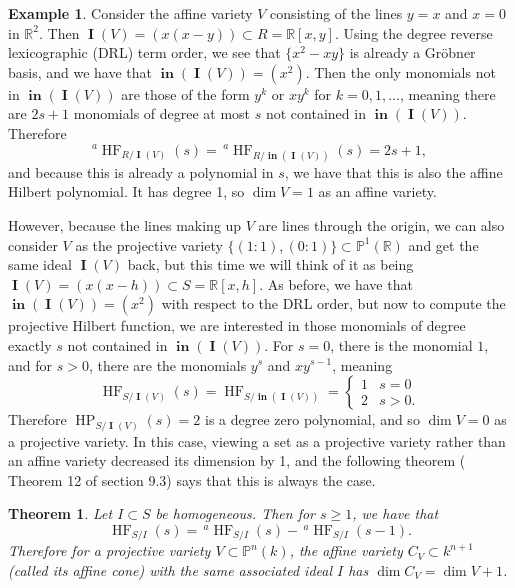 \documentclass[11pt]{article}
\newcommand{\R}{\mathbb{R}}
\newcommand{\Proj}{\mathbb{P}}
\DeclareMathOperator{\Init}{\mathbf{in}}
\DeclareMathOperator{\HF}{HF}
\DeclareMathOperator{\HP}{HP}
\DeclareMathOperator{\I}{\mathbf{I}}
\newtheorem{theorem}{Theorem}
\theoremstyle{definition}
\newtheorem{example}{Example}
\begin{document}
\begin{example}
	Consider the affine variety $V$ consisting of the lines $y = x$ and $x = 0$ in $\R^2$. Then $\I(V) = (x(x - y)) \subset R = \R[x,y]$. Using the degree reverse lexicographic (DRL) term order, we see that $\{x^2 - xy\}$ is already a Gröbner basis, and we have that $\Init(\I(V)) = (x^2)$. Then the only monomials not in $\Init(\I(V))$ are those of the form $y^k$ or $xy^k$ for $k = 0, 1, \dots$, meaning there are $2s + 1$ monomials of degree at most $s$ not contained in $\Init(\I(V))$. Therefore \[ ^a\HF_{R/\I(V)}(s) = \,^a\HF_{R/\Init(\I(V))}(s) = 2s + 1, \] and because this is already a polynomial in $s$, we have that this is also the affine Hilbert polynomial. It has degree 1, so $\dim V = 1$ as an affine variety. 

	However, because the lines making up $V$ are lines through the origin, we can also consider $V$ as the projective variety $\{(1:1), (0:1)\} \subset \Proj^1(\R)$ and get the same ideal $\I(V)$ back, but this time we will think of it as being $\I(V) = (x(x - h)) \subset S = \R[x,h]$. As before, we have that $\Init(\I(V)) = (x^2)$ with respect to the DRL order, but now to compute the projective Hilbert function, we are interested in those monomials of degree exactly $s$ not contained in $\Init(\I(V))$. For $s = 0$, there is the monomial $1$, and for $s > 0$, there are the monomials $y^s$ and $xy^{s - 1}$, meaning \[ \HF_{S/\I(V)}(s) = \HF_{S/\Init(\I(V))} = \begin{cases}
		1 & s = 0 \\
		2 & s > 0.
	\end{cases} \] Therefore $\HP_{S/\I(V)}(s) = 2$ is a degree zero polynomial, and so $\dim V = 0$ as a projective variety. In this case, viewing a set as a projective variety rather than an affine variety decreased its dimension by 1, and the following theorem (\cite{cox2013ideals} Theorem 12 of section 9.3) says that this is always the case. 
\end{example}


\begin{theorem}\label{thm:cone}
	Let $I \subset S$ be homogeneous. Then for $s \geq 1$, we have that \[ \HF_{S/I}(s) = \,^a\HF_{S/I}(s) - \, ^a\HF_{S/I}(s - 1). \] Therefore for a projective variety $V \subset \Proj^n(k)$, the affine variety $C_V \subset k^{n+1}$ (called its affine cone) with the same associated ideal $I$ has $\dim C_V = \dim V + 1$. 
\end{theorem}
\end{document}

